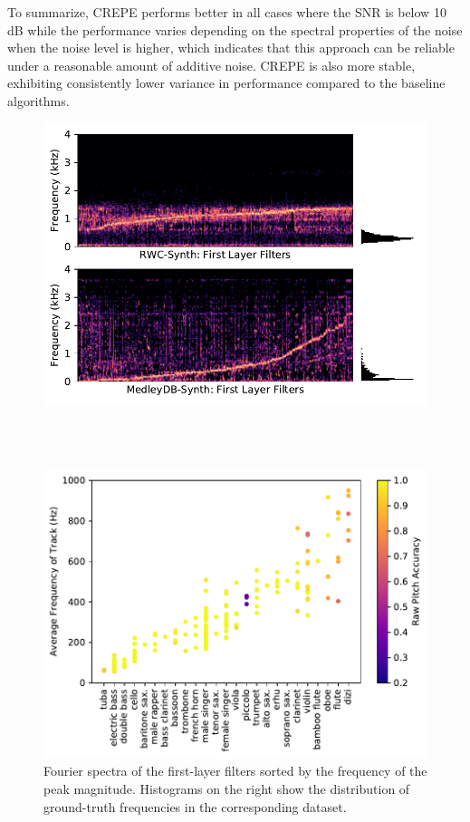 To summarize, CREPE performs better in all cases where the SNR is below 10 dB while the performance varies depending on the spectral properties of the noise when the noise level is higher, which indicates that this approach can be reliable under a reasonable amount of additive noise.
CREPE is also more stable, exhibiting consistently lower variance in performance compared to the baseline algorithms.


\begin{figure}
	\begin{minipage}{\columnwidth}
		\begin{center}
			\includegraphics[width=0.8\columnwidth]{firstlayer-45.pdf}
		\end{center}
		\vspace{-10pt}
		\caption{
			Fourier spectra of the first-layer filters sorted by the frequency of the peak magnitude.
			Histograms on the right show the distribution of ground-truth frequencies in the corresponding dataset.
		}
		\label{fig:firstlayer}
	\end{minipage}
	\\ \vspace{2em} \\ 
	\begin{minipage}{\columnwidth}
		\begin{center}
			\includegraphics[width=0.8\columnwidth]{per-track-inst-45.pdf}

\end{center}
\end{minipage}
\end{figure}
